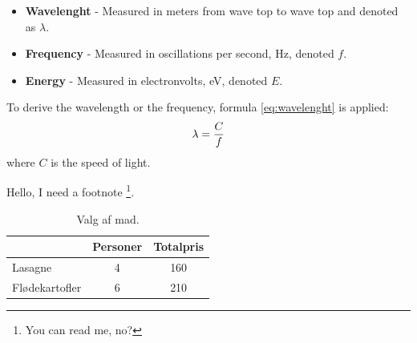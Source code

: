 \begin{itemize}
\item \textbf{Wavelenght} - Measured in meters from wave top to wave top and denoted as $\lambda$.
\item \textbf{Frequency} - Measured in oscillations per second, Hz, denoted $f$.
\item \textbf{Energy} - Measured in electronvolts, eV, denoted $E$.
\end{itemize}

To derive the wavelength or the frequency, formula \ref{eq:wavelenght} is applied:
\begin{align}
\centering 
\lambda = \frac{C}{f}
\label{eq:wavelenght} 
\end{align}
where {$C$} is the speed of light.



Hello, I need a footnote \footnote[0]{You can read me, no?}.

\begin{table}[htbp]
\centering
\begin{tabular}{|l|c|c|}
\hline
& Personer
& Totalpris \\\hline
Lasagne
& 4
& 160
\\\hline
Flødekartofler
& 6
& 210
\\\hline
\end{tabular}
\caption{Valg af mad.}
\label{tab:mums}
\end{table}